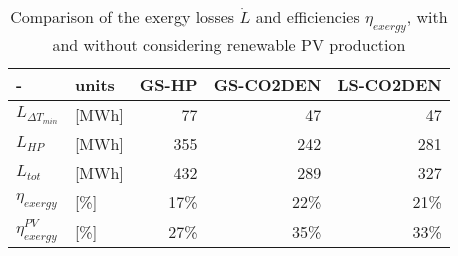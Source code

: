 \begin{table}[htp]
\centering
\caption{Comparison of the exergy losses $\dot{L}$ and efficiencies $\eta_{exergy}$, with and without considering renewable PV production}\vspace{2mm}
\label{tab:V_exergy} 
\begin{tabular}{llrrr} \toprule
	-                    & units & GS-HP & GS-CO2DEN & LS-CO2DEN \\ \midrule
	$L_{\Delta T_{min}}$       & [MWh] & 77    & 47        & 47        \\
	$L_{HP}$             & [MWh] & 355   & 242       & 281       \\
	$L_{tot}$            & [MWh] & 432   & 289       & 327       \\
	$\eta_{exergy}$      & [\%]  & 17\%   & 22\%       & 21\%       \\
	$\eta_{exergy}^{PV}$ & [\%]  & 27\%   & 35\%       & 33\%      \\ \bottomrule
	\end{tabular}
\end{table}
